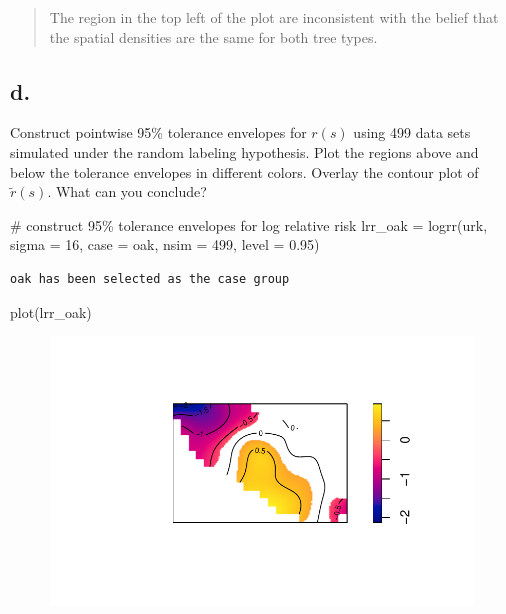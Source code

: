 \documentclass[
  letterpaper,
  DIV=11,
  numbers=noendperiod]{scrartcl}
\newenvironment{Shaded}{\begin{snugshade}}{\end{snugshade}}
\newcommand{\AttributeTok}[1]{\textcolor[rgb]{0.40,0.45,0.13}{#1}}
\newcommand{\CommentTok}[1]{\textcolor[rgb]{0.37,0.37,0.37}{#1}}
\newcommand{\DecValTok}[1]{\textcolor[rgb]{0.68,0.00,0.00}{#1}}
\newcommand{\FloatTok}[1]{\textcolor[rgb]{0.68,0.00,0.00}{#1}}
\newcommand{\FunctionTok}[1]{\textcolor[rgb]{0.28,0.35,0.67}{#1}}
\newcommand{\NormalTok}[1]{\textcolor[rgb]{0.00,0.23,0.31}{#1}}
\newcommand{\OtherTok}[1]{\textcolor[rgb]{0.00,0.23,0.31}{#1}}
\newcommand{\StringTok}[1]{\textcolor[rgb]{0.13,0.47,0.30}{#1}}
\begin{document}
\begin{quote}
The region in the top left of the plot are inconsistent with the belief
that the spatial densities are the same for both tree types.
\end{quote}

\hypertarget{d.}{%
\subsection{d.}\label{d.}}

Construct pointwise 95\% tolerance envelopes for \(r(s)\) using 499 data
sets simulated under the random labeling hypothesis. Plot the regions
above and below the tolerance envelopes in different colors. Overlay the
contour plot of \(\tilde{r}(s)\). What can you conclude?

\begin{Shaded}
\begin{Highlighting}[]
\CommentTok{\# construct 95\% tolerance envelopes for log relative risk}
\NormalTok{lrr\_oak }\OtherTok{=} \FunctionTok{logrr}\NormalTok{(urk, }\AttributeTok{sigma =} \DecValTok{16}\NormalTok{, }\AttributeTok{case =} \StringTok{\textquotesingle{}oak\textquotesingle{}}\NormalTok{, }\AttributeTok{nsim =} \DecValTok{499}\NormalTok{,}
                \AttributeTok{level =} \FloatTok{0.95}\NormalTok{)}
\end{Highlighting}
\end{Shaded}

\begin{verbatim}
oak has been selected as the case group
\end{verbatim}

\begin{Shaded}
\begin{Highlighting}[]
\FunctionTok{plot}\NormalTok{(lrr\_oak)}
\end{Highlighting}
\end{Shaded}

\begin{figure}[H]

{\centering \includegraphics{cc-r-kd-hw_files/figure-pdf/unnamed-chunk-4-1.pdf}

}

\end{figure}
\end{document}
